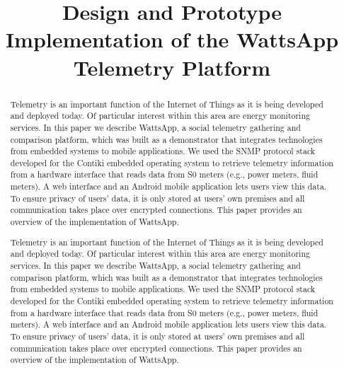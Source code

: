 \documentclass[10pt, conference, compsocconf]{IEEEtran}
\begin{document}
\title{Design and Prototype Implementation of the WattsApp Telemetry Platform}
\author{
}

\maketitle


\begin{abstract}
Telemetry is an important function of the Internet of Things as it
is being developed and deployed today. Of particular interest within
this area are energy monitoring services. In this paper we describe
WattsApp, a social telemetry gathering and comparison platform, which
was built as a demonstrator that integrates technologies from embedded
systems to mobile applications. We used the SNMP protocol stack developed
for the Contiki embedded operating system to retrieve telemetry information
from a hardware interface that reads data from S0 meters (e.g., power
meters, fluid meters). A web interface and an Android mobile application
lets users view this data. To ensure privacy of users' data, it is
only stored at users' own premises and all communication takes place
over encrypted connections. This paper provides an overview of the
implementation of WattsApp. 
\end{abstract}

\begin{abstract}
Telemetry is an important function of the Internet of Things as it
is being developed and deployed today. Of particular interest within
this area are energy monitoring services. In this paper we describe
WattsApp, a social telemetry gathering and comparison platform, which
was built as a demonstrator that integrates technologies from embedded
systems to mobile applications. We used the SNMP protocol stack developed
for the Contiki embedded operating system to retrieve telemetry information
from a hardware interface that reads data from S0 meters (e.g., power
meters, fluid meters). A web interface and an Android mobile application
lets users view this data. To ensure privacy of users' data, it is
only stored at users' own premises and all communication takes place
over encrypted connections. This paper provides an overview of the
implementation of WattsApp. 
\end{abstract}
\end{document}
